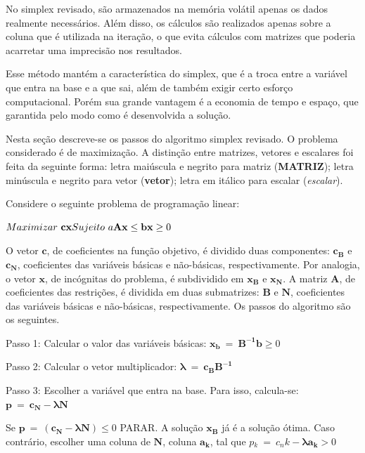 No simplex revisado, são armazenados na memória volátil apenas os dados realmente necessários. Além disso, os cálculos são realizados apenas sobre a coluna que é utilizada na iteração, o que evita cálculos com matrizes que poderia acarretar uma imprecisão nos resultados.

Esse método mantém a característica do simplex, que é a troca entre a variável que entra na base e a que sai, além de também exigir certo esforço computacional. Porém sua grande vantagem é a economia de tempo e espaço, que garantida pelo modo como é desenvolvida a solução. 

Nesta seção descreve-se os passos do algoritmo simplex revisado. O problema considerado é de maximização. A distinção entre matrizes, vetores e escalares foi feita da seguinte forma: letra maiúscula e negrito para matriz (\textbf{MATRIZ}); letra minúscula e negrito para vetor (\textbf{vetor}); letra em itálico para escalar (\textit{escalar}).

Considere o seguinte problema de programação linear:

$\\
Maximizar\ \mathbf{cx} \\
Sujeito\ a \\
\mathbf{Ax} \leq \mathbf{b} \\
\mathbf{x} \geq0$

O vetor $\mathbf{c}$, de coeficientes na função objetivo, é dividido duas componentes: $\mathbf{c{_B}}$ e $\mathbf{c{_N}}$, coeficientes das variáveis básicas e não-básicas, respectivamente. Por analogia, o vetor $\mathbf{x}$, de incógnitas do problema, é subdividido em $\mathbf{x{_B}}$ e $\mathbf{x{_N}}$.  A matriz $\mathbf{A}$, de coeficientes das restrições, é dividida em duas submatrizes: $\mathbf{B}$ e $\mathbf{N}$, coeficientes das variáveis básicas e não-básicas, respectivamente. Os passos do algoritmo são os seguintes.

Passo 1: Calcular o valor das variáveis básicas: $\mathbf{x_{b}}\ =\ \mathbf{B^{-1}b}\geq0$

Passo 2: Calcular o vetor multiplicador: $\mathbf{\lambda} \ =\ \mathbf{c{_B}B^{-1}}$

Passo 3: Escolher a variável que entra na base. Para isso, calcula-se: $\mathbf{p}\ =\ \mathbf{c{_N}}-\mathbf{\lambda N}$

Se $\mathbf{p}\ =\ (\mathbf{c{_N}}-\mathbf{\lambda N})\leq 0$ PARAR. A solução $\mathbf{x{_B}}$ já é a solução ótima. Caso contrário, escolher uma coluna de $\mathbf{N}$, coluna $\mathbf{a{_k}}$, tal que $\mathit{p{_k}}\ =\ \mathit{c{_nk}}-\mathbf{\lambda a{_k}}> 0$


